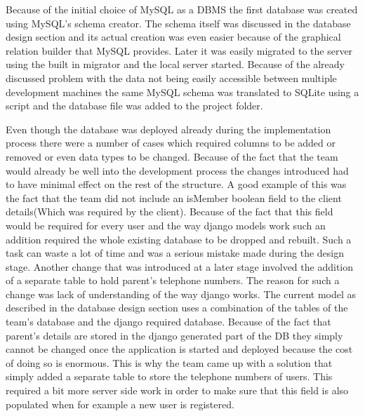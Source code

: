 \documentclass{l3proj}
\begin{document}
\par Because of the initial choice of MySQL as a DBMS the first database was created using MySQL’s schema creator. The schema itself was discussed in the database design section and its actual creation was even easier because of the graphical relation builder that MySQL provides. Later it was easily migrated to the server using the built in migrator and the local server started. Because of the already discussed problem with the data not being easily accessible between multiple development machines the same MySQL schema was translated to SQLite using a script and the database file was added to the project folder.\\
\par 
Even though the database was deployed already during the implementation process there were a number of cases which required columns to be added or removed or even data types to be changed. Because of the fact that the team would already be well into the development process the changes introduced had to have minimal effect on the rest of the structure. A good example of this was the fact that the team did not include an isMember boolean field to the client details(Which was required by the client). Because of the fact that this field would be required for every user and the  way django models work such an addition required the whole existing database to be dropped and rebuilt. Such a task can waste a lot of time and was a serious mistake made during the design stage. Another change that was introduced at a later stage involved the addition of a separate table to hold parent’s telephone numbers. The reason for such a change was lack of understanding of the way django works. The current model as described in the database design section uses a combination of the tables of the team’s database and the django required database. Because of the fact that parent’s details are stored in the django generated part of the DB they simply cannot be changed once the application is started and deployed because the cost of doing so is enormous. This is why the team came up with a solution that simply added a separate table to store the telephone numbers of users. This required a bit more server side work in order to make sure that this field is also populated when for example a new user is registered. \\


\end{document}

